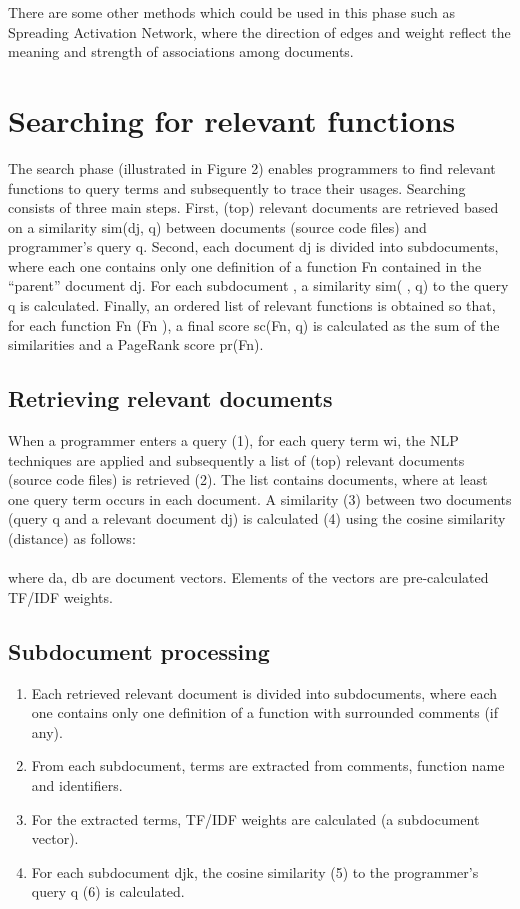 \documentclass{llncs}
\begin{document}
There are some other methods which could be used in this phase such as Spreading
Activation Network, where the direction of edges and weight reflect the meaning and
strength of associations among documents.
\section {Searching for relevant functions}

The search phase (illustrated in Figure 2) enables programmers to find relevant functions
to query terms and subsequently to trace their usages. Searching consists of
three main steps. First, (top) relevant documents are retrieved based on a similarity
sim(dj, q) between documents (source code files) and programmer’s query q. Second,
each document dj is divided into subdocuments, where each one contains only one
definition of a function Fn contained in the “parent” document dj. For each subdocument
, a similarity sim( , q) to the query q is calculated. Finally, an ordered list
of relevant functions is obtained so that, for each function Fn (Fn ), a final score
sc(Fn, q) is calculated as the sum of the similarities and a PageRank score pr(Fn).
\subsection{Retrieving relevant documents}

When a programmer enters a query (1), for each query term wi, the NLP techniques
are applied and subsequently a list of (top) relevant documents (source code files) is
retrieved (2). The list contains documents, where at least one query term occurs in
each document. A similarity (3) between two documents (query q and a relevant document
dj) is calculated (4) using the cosine similarity (distance) as follows:\\ \\
where da, db are document vectors. Elements of the vectors are pre-calculated TF/IDF
weights.
\subsection{Subdocument processing}
\begin{enumerate}
\item Each retrieved relevant document is divided into subdocuments, where each one
contains only one definition of a function with surrounded comments (if any).
\item From each subdocument, terms are extracted from comments, function name and
identifiers.
\item For the extracted terms, TF/IDF weights are calculated (a subdocument vector).
\item For each subdocument djk, the cosine similarity (5) to the programmer’s query q (6)
is calculated.
\end{enumerate}
\end{document}
